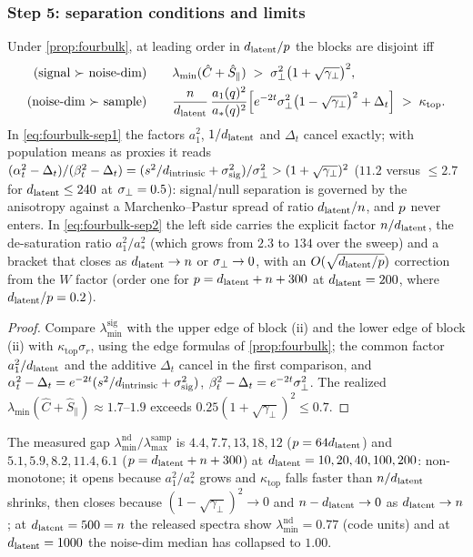 \subsubsection{Step 5: separation conditions and limits}

\begin{corollary}\label{cor:fourbulk-separation}
Under \cref{prop:fourbulk}, at leading order in $d_{\mathrm{latent}}/p$ the blocks are disjoint iff
\begin{align}
  \text{(signal $\succ$ noise-dim)}\qquad& \lambda_{\min}(\hat C+\hat S_\parallel)\;>\;\sigma_{\perp}^2\bigl(1+\sqrt{\gamma_\perp}\bigr)^2,
  \label{eq:fourbulk-sep1}\\
  \text{(noise-dim $\succ$ sample)}\qquad& \frac{n}{d_{\mathrm{latent}}}\,\frac{a_1(q)^2}{a_*(q)^2}\Bigl[e^{-2t}\sigma_{\perp}^2\bigl(1-\sqrt{\gamma_\perp}\bigr)^2+\Delta_t\Bigr]\;>\;\kappa_{\mathrm{top}} .
  \label{eq:fourbulk-sep2}
\end{align}
In \eqref{eq:fourbulk-sep1} the factors $a_1^2$, $1/d_{\mathrm{latent}}$ and $\Delta_t$ cancel exactly; with population means as proxies it reads $(\alpha_t^2-\Delta_t)/(\beta_t^2-\Delta_t)=(s^2/d_{\mathrm{intrinsic}}+\sigma_{\mathrm{sig}}^2)/\sigma_{\perp}^2>(1+\sqrt{\gamma_\perp})^2$ ($11.2$ versus $\le2.7$ for $d_{\mathrm{latent}}\le240$ at $\sigma_{\perp}=0.5$): signal/null separation is governed by the anisotropy against a Marchenko--Pastur spread of ratio $d_{\mathrm{latent}}/n$, and $p$ never enters. In \eqref{eq:fourbulk-sep2} the left side carries the explicit factor $n/d_{\mathrm{latent}}$, the de-saturation ratio $a_1^2/a_*^2$ (which grows from $2.3$ to $134$ over the sweep) and a bracket that closes as $d_{\mathrm{latent}}\to n$ or $\sigma_{\perp}\to0$, with an $O(\sqrt{d_{\mathrm{latent}}/p})$ correction from the $W$ factor (order one for $p=d_{\mathrm{latent}}+n+300$ at $d_{\mathrm{latent}}=200$, where $d_{\mathrm{latent}}/p=0.2$).
\end{corollary}
\begin{proof}
Compare $\lambda^{\mathrm{sig}}_{\min}$ with the upper edge of block (ii) and the lower edge of block (ii) with $\kappa_{\mathrm{top}}\sigma_r$, using the edge formulas of \cref{prop:fourbulk}; the common factor $a_1^2/d_{\mathrm{latent}}$ and the additive $\Delta_t$ cancel in the first comparison, and $\alpha_t^2-\Delta_t=e^{-2t}(s^2/d_{\mathrm{intrinsic}}+\sigma_{\mathrm{sig}}^2)$, $\beta_t^2-\Delta_t=e^{-2t}\sigma_{\perp}^2$. The realized $\lambda_{\min}(\hat C+\hat S_\parallel)\approx1.7$--$1.9$ exceeds $0.25(1+\sqrt{\gamma_\perp})^2\le0.7$.
\end{proof}
The measured gap $\lambda^{\mathrm{nd}}_{\min}/\lambda^{\mathrm{samp}}_{\max}$ is $4.4,7.7,13,18,12$ ($p=64d_{\mathrm{latent}}$) and $5.1,5.9,8.2,11.4,6.1$ ($p=d_{\mathrm{latent}}+n+300$) at $d_{\mathrm{latent}}=10,20,40,100,200$: non-monotone; it opens because $a_1^2/a_*^2$ grows and $\kappa_{\mathrm{top}}$ falls faster than $n/d_{\mathrm{latent}}$ shrinks, then closes because $(1-\sqrt{\gamma_\perp})^2\to0$ and $n-d_{\mathrm{latent}}\to0$ as $d_{\mathrm{latent}}\to n$; at $d_{\mathrm{latent}}=500=n$ the released spectra show $\lambda^{\mathrm{nd}}_{\min}=0.77$ (code units) and at $d_{\mathrm{latent}}=1000$ the noise-dim median has collapsed to $1.00$.

